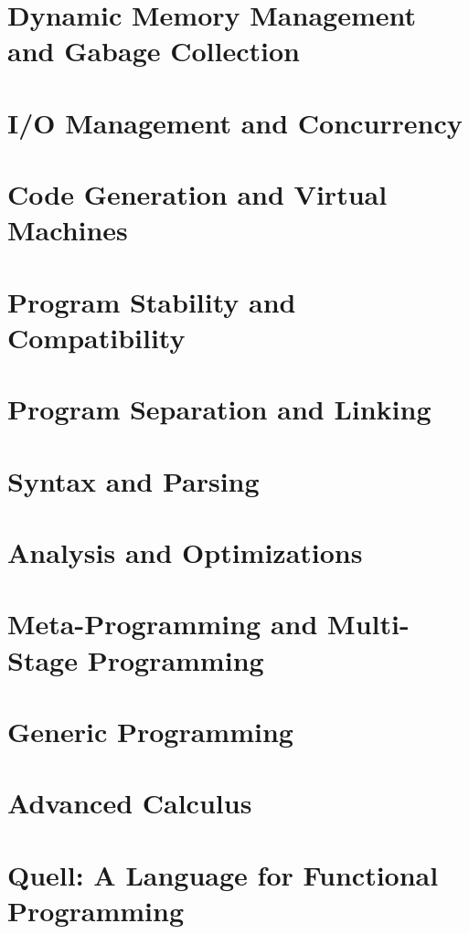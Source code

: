 \documentclass[
  luatex,
  japanese,
  unicode,
  titlepage,
  pdfusetitle
]{ltjsbook}
\begin{document}
\chapter{Dynamic Memory Management and Gabage Collection}

\chapter{I/O Management and Concurrency}

\chapter{Code Generation and Virtual Machines}

\chapter{Program Stability and Compatibility}

\chapter{Program Separation and Linking}

\chapter{Syntax and Parsing}





\chapter{Analysis and Optimizations}

\chapter{Meta-Programming and Multi-Stage Programming}

\chapter{Generic Programming}

\chapter{Advanced Calculus}

\chapter{Quell: A Language for Functional Programming}






\end{document}
